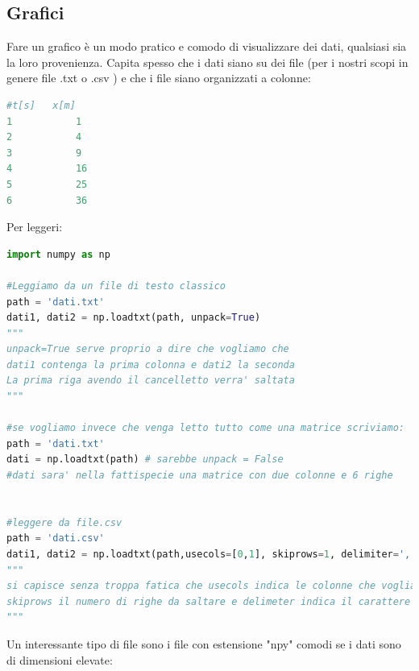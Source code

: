 \documentclass[10pt,a4paper]{article}
\begin{document}
\subsection{Grafici}
Fare un grafico è un modo pratico e comodo di visualizzare dei dati, qualsiasi sia la loro provenienza.
Capita spesso che i dati siano su dei file (per i nostri scopi in genere file .txt o .csv ) e che i file siano organizzati a colonne:

\begin{lstlisting}[language=Python]
#t[s]	x[m]
1			1
2			4
3			9
4			16
5			25
6			36
\end{lstlisting}
Per leggeri:
\begin{lstlisting}[language=Python]
import numpy as np

#Leggiamo da un file di testo classico
path = 'dati.txt'
dati1, dati2 = np.loadtxt(path, unpack=True)
"""
unpack=True serve proprio a dire che vogliamo che
dati1 contenga la prima colonna e dati2 la seconda
La prima riga avendo il cancelletto verra' saltata
"""

#se vogliamo invece che venga letto tutto come una matrice scriviamo:
path = 'dati.txt'
dati = np.loadtxt(path) # sarebbe unpack = False
#dati sara' nella fattispecie una matrice con due colonne e 6 righe


#leggere da file.csv
path = 'dati.csv'
dati1, dati2 = np.loadtxt(path,usecols=[0,1], skiprows=1, delimiter=',',unpack=True)
"""
si capisce senza troppa fatica che usecols indica le colonne che vogliamo leggere
skiprows il numero di righe da saltare e delimeter indica il carattere che separa le colonne
"""
\end{lstlisting}
Un interessante tipo di file sono i file con estensione "npy" comodi se i dati sono di dimensioni elevate:
\end{document}
